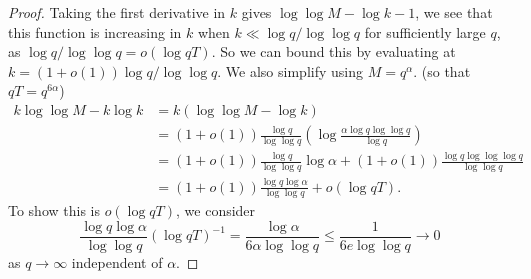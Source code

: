 \begin{proof}
    Taking the first derivative in $k$ gives $\log \log M -\log k - 1$, we see that this function is increasing in $k$ when $k\ll \log q/\log \log q$ for sufficiently large $q$, as $\log q/\log \log q = o(\log qT)$.
    So we can bound this by evaluating at $k=(1+o(1))\log q/\log \log q.$ We also simplify using $M=q^{\alpha}$. (so that $qT=q^{6\alpha}$) \begin{align*}
        k\log \log M - k\log k &=k(\log \log M -\log k)\\&= (1+o(1))\frac{\log q}{\log \log q} \left(\log \frac{\alpha \log q \log \log q}{\log q}\right) \\&=(1+o(1))\frac{\log q}{\log \log q}\log \alpha + (1+o(1))\frac{\log q\log \log \log q}{\log \log q}
        \\&=(1+o(1))\frac{\log q \log \alpha}{\log \log q} + o(\log qT). 
    \end{align*}
    To show this is $o(\log qT)$, we consider \[
    \frac{\log q\log \alpha}{\log \log q} (\log qT)^{-1} =\frac{\log \alpha}{6\alpha \log \log q}\leq  \frac{1}{6e\log \log q} \to 0 
    \]
    as $q\to \infty$ independent of $\alpha$.

\end{proof}
